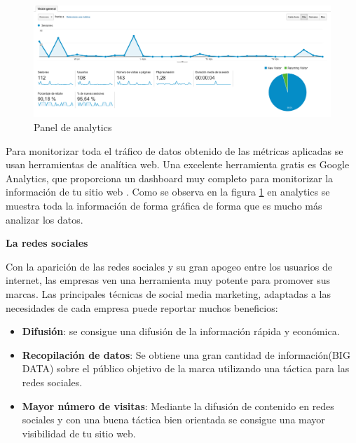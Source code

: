 \begin{figure}
\begin{center}
\includegraphics[width=1.0\textwidth]{imagenes/analytics.png}
\caption{Panel de analytics}
\label{analytics}
\end{center}
\end{figure}

Para monitorizar toda el tráfico de datos obtenido de las métricas aplicadas se usan herramientas de analítica web. Una excelente herramienta gratis es Google Analytics, que proporciona un dashboard muy completo para monitorizar la información de tu sitio web \cite{analytics}. Como se observa en la figura \ref{analytics} en analytics se muestra toda la información de forma gráfica de forma que es mucho más analizar los datos.

\textbf{La redes sociales} 

\vspace{5 mm}

Con la aparición de las redes sociales y su gran apogeo entre los usuarios de internet, las empresas ven una herramienta muy potente para promover sus marcas. Las principales técnicas de social media marketing, adaptadas a las necesidades de cada empresa  puede reportar muchos beneficios:

\begin{itemize}

\item \textbf{Difusión}: se consigue una difusión de la información rápida y económica.

\item \textbf{Recopilación de datos}: Se obtiene una gran cantidad de información(BIG DATA) sobre el público objetivo de la marca utilizando una táctica para las redes sociales.

\item \textbf{Mayor número de visitas}: Mediante la difusión de contenido en redes sociales y con una buena táctica bien orientada se consigue una mayor visibilidad de tu sitio web.

\end{itemize}

